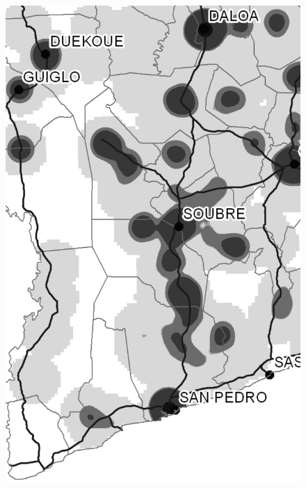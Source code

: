 \begin{figure}[h!]
{    \includegraphics[scale = 0.1]{results/images/kernel/l_hour6_kd_detail.pdf}
	\label{fig:subfig2_detail}
}
\subfigure[Monday, 07:00]{
}
\end{figure}
